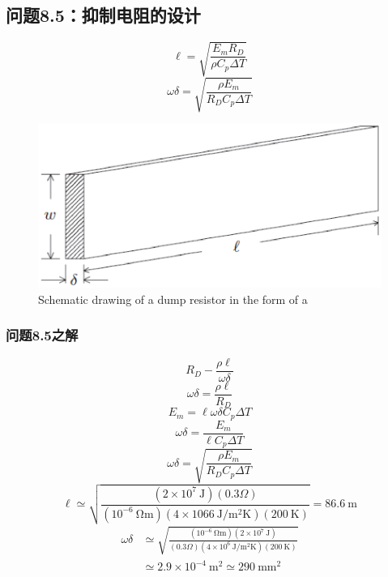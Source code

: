 \subsection{问题8.5：抑制电阻的设计}
\begin{equation}%
\ell=\sqrt{\frac{E_mR_D}{\rho C_p\Delta T}}
\end{equation}
\begin{equation}%
\omega\delta=\sqrt{\frac{\rho E_m}{R_DC_p\Delta T}}
\end{equation}

\begin{figure}
	\centering
	\includegraphics[scale=0.6]{chpt8/figs/fig8.22.eps}
	\caption{Schematic drawing of a dump resistor in the form of a}
\end{figure}






\subsubsection{问题8.5之解}

\begin{equation}%
R_D-\frac{\rho\ell}{\omega\delta}
\end{equation}
\begin{equation}%
\omega\delta=\frac{\rho\ell}{R_D}
\end{equation}
\begin{equation}%
E_m=\ell\omega\delta C_p\Delta T
\end{equation}
\begin{equation}%
\omega\delta=\frac{E_m}{\ell C_p\Delta T}
\end{equation}
\begin{equation}%
\omega\delta=\sqrt{\frac{\rho E_m}{R_DC_p\Delta T}}
\end{equation}
\begin{equation}%
\ell\simeq\sqrt{\frac{(2\times 10^7\ \mathrm{J})(0.3\Omega)}{(10^{-6}\ \mathrm{\Omega m})(4\times 1066\ \mathrm{J/m^2K})(200\ \mathrm{K})}} 
=86.6\ \mathrm{m}
\end{equation}
\begin{align*}%
\omega\delta&\simeq\sqrt{\frac{(10^{-6}\ \mathrm{\Omega m})(2\times 10^7\ \mathrm{J})}{(0.3\Omega)(4\times 10^6\ \mathrm{J/m^2K})(200\ \mathrm{K})}} \\
&\simeq 2.9\times 10^{-4}\ \mathrm{m^2}\simeq 290\ \mathrm{mm^2}
\end{align*}


